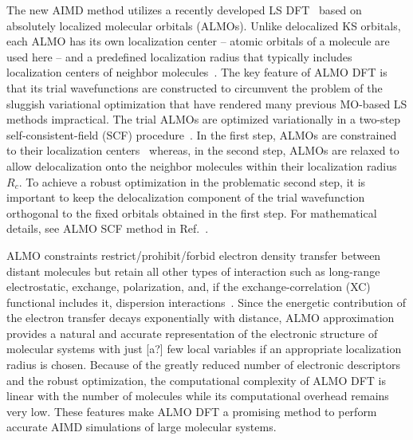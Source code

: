 \documentclass[aps,prl,reprint,amsmath,amssymb]{revtex4-1}
\begin{document}
The new AIMD method utilizes a recently developed LS DFT~\cite{a:almo-ls} based on absolutely localized molecular orbitals (\mbox{ALMOs}). 
Unlike delocalized KS orbitals, each \mbox{ALMO} has its own localization center -- atomic orbitals of a molecule are used here -- and a predefined localization radius that typically includes localization centers of neighbor molecules~\cite{a:stoll,a:almo-ls}. 
The key feature of ALMO DFT is that its trial wavefunctions are constructed to circumvent the problem of the sluggish variational optimization that have rendered many previous MO-based LS methods impractical. 
The trial ALMOs are optimized variationally in a two-step self-consistent-field (SCF) procedure~\cite{a:almo-ls}. 
In the first step, ALMOs are constrained to their localization centers~\cite{a:khal} whereas, in the second step, ALMOs are relaxed to allow delocalization onto the neighbor molecules within their localization radius $R_{c}$. 
To achieve a robust optimization in the problematic second step, it is important to keep the delocalization component of the trial wavefunction orthogonal to the fixed orbitals obtained in the first step. 
For mathematical details, see ALMO SCF method in Ref.~.

ALMO constraints restrict/prohibit/forbid electron density transfer between distant molecules but retain all other types of interaction such as long-range electrostatic, exchange, polarization, and, if the exchange-correlation (XC) functional includes it, dispersion interactions~\cite{a:theeda}. 
Since the energetic contribution of the electron transfer decays exponentially with distance, \mbox{ALMO} approximation provides a natural and accurate representation of the electronic structure of molecular systems with just [a?] few local variables if an appropriate localization radius is chosen. 
Because of the greatly reduced number of electronic descriptors and the robust optimization, the computational complexity of ALMO DFT is linear with the number of molecules while its computational overhead remains very low. These features make ALMO DFT a promising method to perform accurate AIMD simulations of large molecular systems.
\end{document}
